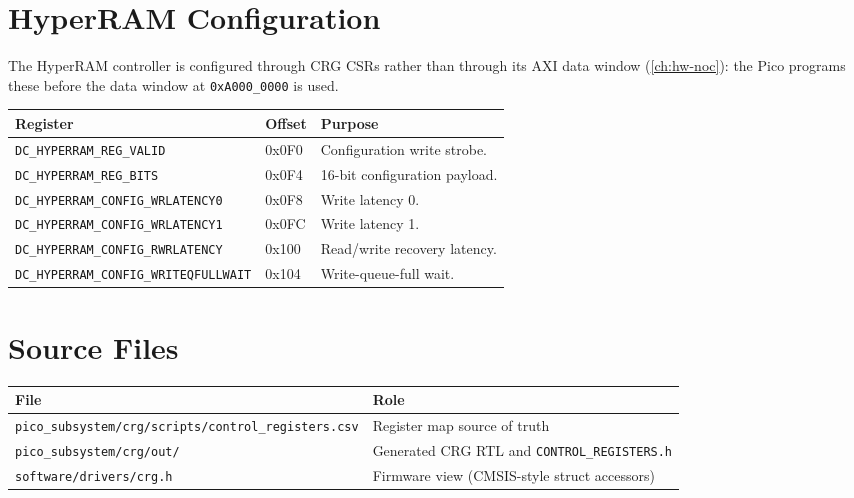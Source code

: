 \section{HyperRAM Configuration}
The HyperRAM controller is configured through CRG CSRs rather than through its AXI data window
(\autoref{ch:hw-noc}): the Pico programs these before the data window at \texttt{0xA000\_0000} is used.

\begin{tabular}{@{}lll@{}}
\toprule
\textbf{Register} & \textbf{Offset} & \textbf{Purpose} \\
\midrule
\texttt{DC\_HYPERRAM\_REG\_VALID}            & 0x0F0 & Configuration write strobe. \\
\texttt{DC\_HYPERRAM\_REG\_BITS}             & 0x0F4 & 16-bit configuration payload. \\
\texttt{DC\_HYPERRAM\_CONFIG\_WRLATENCY0}    & 0x0F8 & Write latency 0. \\
\texttt{DC\_HYPERRAM\_CONFIG\_WRLATENCY1}    & 0x0FC & Write latency 1. \\
\texttt{DC\_HYPERRAM\_CONFIG\_RWRLATENCY}    & 0x100 & Read/write recovery latency. \\
\texttt{DC\_HYPERRAM\_CONFIG\_WRITEQFULLWAIT}& 0x104 & Write-queue-full wait. \\
\bottomrule
\end{tabular}

\section{Source Files}

\begin{tabular}{@{}ll@{}}
\toprule
\textbf{File} & \textbf{Role} \\
\midrule
\texttt{pico\_subsystem/crg/scripts/control\_registers.csv} & Register map source of truth \\
\texttt{pico\_subsystem/crg/out/} & Generated CRG RTL and \texttt{CONTROL\_REGISTERS.h} \\
\texttt{software/drivers/crg.h} & Firmware view (CMSIS-style struct accessors) \\
\bottomrule
\end{tabular}

\newpage
